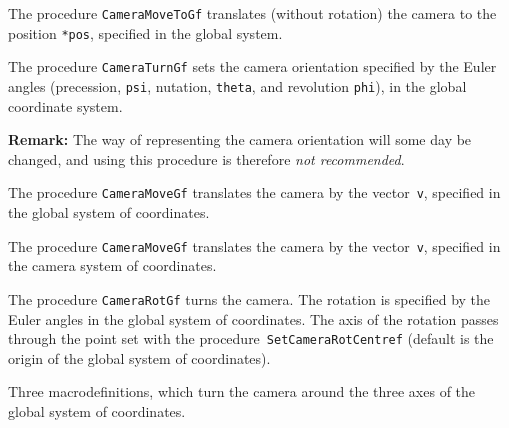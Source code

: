 \vspace{\bigskipamount}
The procedure \texttt{CameraMoveToGf} translates (without rotation) the
camera to the position \texttt{*pos}, specified in the global system.  

\vspace{\bigskipamount}
The procedure \texttt{CameraTurnGf} sets the camera orientation specified
by the Euler angles (precession, \texttt{psi}, nutation, \texttt{theta}, 
and revolution \texttt{phi}),
in the global coordinate system.

\vspace{\medskipamount}
\begin{sloppypar}\noindent
\textbf{Remark:} The way of representing the camera orientation will some
day
be changed, and using this procedure is therefore \emph{not recommended}.
\end{sloppypar}

\vspace{\bigskipamount}
The procedure \texttt{CameraMoveGf} translates the camera by the
vector~\texttt{v}, specified in the global system of coordinates.

\vspace{\bigskipamount}
The procedure \texttt{CameraMoveGf} translates the camera by the
vector~\texttt{v}, specified in the camera system of coordinates.

\vspace{\bigskipamount}
The procedure \texttt{CameraRotGf} turns the camera. The rotation is
specified by the Euler angles in the global system of coordinates.  
The axis of the rotation passes through the point set with
the procedure~\texttt{SetCameraRotCentref} (default is the origin of
the global system of coordinates).

\vspace{\bigskipamount}
Three macrodefinitions, which turn the camera around the three axes of the
global system of coordinates.

